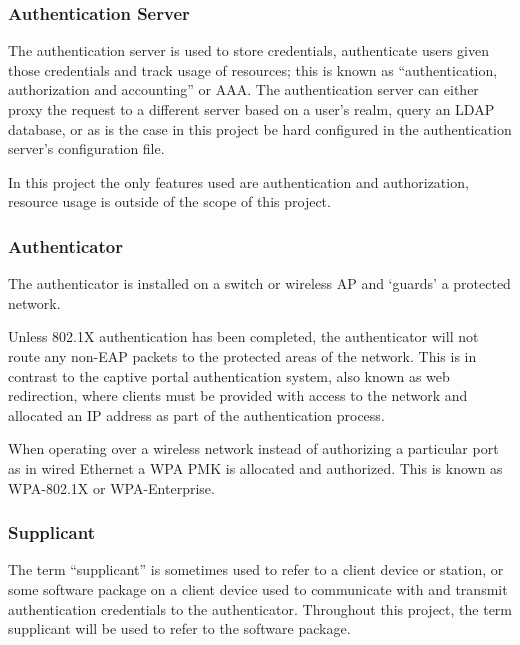 \documentclass[pdftex, 12pt, a4paper]{article}
\begin{document}

\subsubsection{Authentication Server}
The authentication server is used to store credentials, authenticate users given those credentials and track usage of resources; this is known as ``authentication, authorization and accounting'' or AAA\cite{RFC2865,RFC2866}.  The authentication server can either proxy the request to a different server based on a user's realm, query an LDAP database, or as is the case in this project be hard configured in the authentication server's configuration file.

In this project the only features used are authentication and authorization, resource usage is outside of the scope of this project.

\subsubsection{Authenticator}
The authenticator is installed on a switch or wireless AP and `guards' a protected network.

Unless 802.1X authentication has been completed, the authenticator will not route any non-EAP packets to the protected areas of the network\cite{8021X-book}. This is in contrast to the captive portal authentication system, also known as web redirection, where clients must be provided with access to the network and allocated an IP address as part of the authentication process\cite{wifi-dog}.

When operating over a wireless network instead of authorizing a particular port as in wired Ethernet a WPA PMK is allocated and authorized.  This is known as WPA-802.1X or WPA-Enterprise\cite{IEEE8021X-2004}.

\subsubsection{Supplicant}
The term ``supplicant'' is sometimes used to refer to a client device or station, or some software package on a client device used to communicate with and transmit authentication credentials to the authenticator.  Throughout this project, the term supplicant will be used to refer to the software package.
\end{document}
